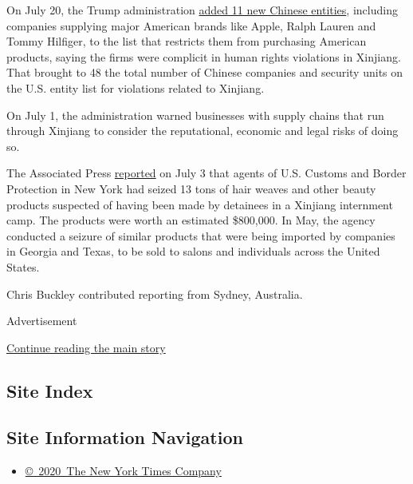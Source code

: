 On July 20, the Trump administration
\href{https://www.nytimes.com/2020/07/20/business/economy/china-sanctions-uighurs-labor.html}{added
11 new Chinese entities}, including companies supplying major American
brands like Apple, Ralph Lauren and Tommy Hilfiger, to the list that
restricts them from purchasing American products, saying the firms were
complicit in human rights violations in Xinjiang. That brought to 48 the
total number of Chinese companies and security units on the U.S. entity
list for violations related to Xinjiang.

On July 1, the administration warned businesses with supply chains that
run through Xinjiang to consider the reputational, economic and legal
risks of doing so.

The Associated Press
\href{https://apnews.com/fff5fc7925f09916bf6b9d5f79bb4132}{reported} on
July 3 that agents of U.S. Customs and Border Protection in New York had
seized 13 tons of hair weaves and other beauty products suspected of
having been made by detainees in a Xinjiang internment camp. The
products were worth an estimated \$800,000. In May, the agency conducted
a seizure of similar products that were being imported by companies in
Georgia and Texas, to be sold to salons and individuals across the
United States.

Chris Buckley contributed reporting from Sydney, Australia.

Advertisement

\protect\hyperlink{after-bottom}{Continue reading the main story}

\hypertarget{site-index}{%
\subsection{Site Index}\label{site-index}}

\hypertarget{site-information-navigation}{%
\subsection{Site Information
Navigation}\label{site-information-navigation}}

\begin{itemize}
\tightlist
\item
  \href{https://help.nytimes.com/hc/en-us/articles/115014792127-Copyright-notice}{©~2020~The
  New York Times Company}
\end{itemize}

